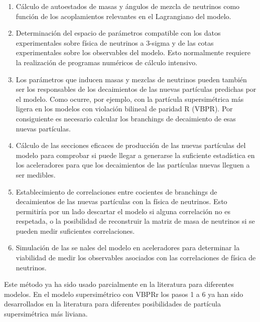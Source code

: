 \begin{ideas}
\begin{enumerate}
\item Cálculo de autoestados de masas y ángulos de mezcla de neutrinos
  como función de los acoplamientos relevantes en el Lagrangiano del
  modelo.

\item Determinación del espacio de parámetros compatible con los datos
  experimentales sobre física de neutrinos a 3-sigma y de las cotas
  experimentales sobre los observables del modelo. Esto normalmente
  requiere la realización de programas numéricos de cálculo intensivo.

\item Los parámetros que inducen masas y mezclas de neutrinos pueden
  también ser los responsables de los decaimientos de las nuevas
  partículas predichas por el modelo. Como ocurre, por ejemplo, con la
  partícula supersimétrica más ligera en los modelos con violación
  bilineal de paridad R (VBPR). Por consiguiente es necesario calcular
  los branchings de decaimiento de esas nuevas partículas.

\item Cálculo de las secciones eficaces de producción de las nuevas
  partículas del modelo para comprobar si puede llegar a generarse la
  suficiente estadística en los aceleradores para que los decaimientos
  de las partículas nuevas lleguen a ser medibles.

\item Establecimiento de correlaciones entre cocientes de branchings
  de decaimientos de las nuevas partículas con la física de neutrinos.
  Esto permitiría por un lado descartar el modelo si alguna
  correlación no es respetada, o la posibilidad de reconstruir la
  matriz de masa de neutrinos si se pueden medir suficientes
  correlaciones.

\item Simulación de las se nales del modelo en aceleradores para
  determinar la viabilidad de medir los observables asociados con las
  correlaciones de física de neutrinos.
\end{enumerate}
Este método ya ha sido usado parcialmente en la literatura para
diferentes modelos.  En el modelo supersimétrico con VBPRr los pasos 1
a 6 ya han sido desarrollados en la literatura para diferentes
posibilidades de partícula supersimétrica más liviana.



\end{ideas}
